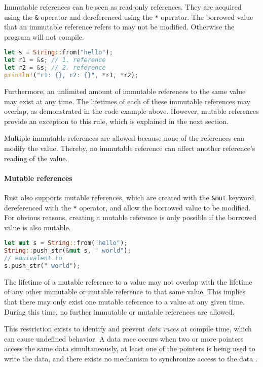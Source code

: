 \documentclass[sigplan,11pt,nonacm]{acmart}
\begin{document}
Immutable references can be seen as read-only references.
They are acquired using the \verb|&| operator and dereferenced using the \verb|*| operator.
The borrowed value that an immutable reference refers to may not be modified.
Otherwise the program will not compile.

\begin{lstlisting}[language=Rust]
let s = String::from("hello");
let r1 = &s; // 1. reference
let r2 = &s; // 2. reference
println!("r1: {}, r2: {}", *r1, *r2);
\end{lstlisting}

Furthermore, an unlimited amount of immutable references to the same value may exist at any time.
The lifetimes of each of these immutable references may overlap, as demonstrated in the code example above.
However, mutable references provide an exception to this rule, which is explained in the next section.

Multiple immutable references are allowed because none of the references can modify the value.
Thereby, no immutable reference can affect another reference's reading of the value.


\paragraph{Mutable references}

Rust also supports mutable references, which are created with the \verb|&mut| keyword, dereferenced with the \verb|*| operator, and allow the borrowed value to be modified.
For obvious reasons, creating a mutable reference is only possible if the borrowed value is also mutable.

\begin{lstlisting}[language=Rust]
let mut s = String::from("hello");
String::push_str(&mut s, " world");
// equivalent to
s.push_str(" world");
\end{lstlisting}

The lifetime of a mutable reference to a value may not overlap with the lifetime of any other immutable or mutable reference to that same value.
This implies that there may only exist one mutable reference to a value at any given time.
During this time, no further immutable or mutable references are allowed.

This restriction exists to identify and prevent \emph{data races} at compile time, which can cause undefined behavior.
A data race occurs when two or more pointers access the same data simultaneously, at least one of the pointers is being used to write the data, and there exists no mechanism to synchronize access to the data \cite{rust-book}.
\end{document}
